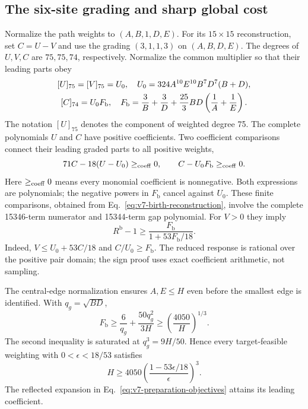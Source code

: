 \documentclass[aps,pre,reprint,amsmath,amssymb,longbibliography]{revtex4-2}
\begin{document}
\subsection{The six-site grading and sharp global cost}
\label{app:v7-birth-p6-cost}
Normalize the path weights to $(A,B,1,D,E)$. For its
$15\times15$ reconstruction, set $C=U-V$ and use the grading
$(3,1,1,3)$ on $(A,B,D,E)$. The degrees of $U,V,C$ are
$75,75,74$, respectively. Normalize the common multiplier so that
their leading parts obey
\begin{equation}
 \begin{gathered}
 \relax[U]_{75}=[V]_{75}=U_0,
 \quad U_0=324A^{10}E^{10}B^7D^7(B+D),\\
 [C]_{74}=U_0F_{\mathrm b},\quad
 F_{\mathrm b}=\frac3B+\frac3D
  +\frac{25}{3}BD\left(\frac1A+\frac1E\right).
 \end{gathered}
 \label{eq:v7-birth-p6-leading-grade}
\end{equation}
The notation $[U]_{75}$ denotes the component of weighted degree
75. The complete polynomials $U$ and $C$ have positive
coefficients. Two coefficient comparisons connect their leading
graded parts to all positive weights,
\begin{equation}
 71C-18(U-U_0)\ge_{\rm coeff}0,\qquad
 C-U_0F_{\mathrm b}\ge_{\rm coeff}0.
 \label{eq:v7-birth-p6-coefficients}
\end{equation}
Here $\ge_{\rm coeff}0$ means every monomial coefficient is nonnegative.
Both expressions are polynomials; the negative powers in
$F_{\mathrm b}$ cancel against $U_0$. These finite comparisons,
obtained from Eq.~\eqref{eq:v7-birth-reconstruction}, involve the
complete 15346-term numerator and 15344-term gap polynomial.
For $V>0$ they imply
\begin{equation}
 R^{\mathrm b}-1\ge
 \frac{F_{\mathrm b}}{1+53F_{\mathrm b}/18}.
 \label{eq:v7-birth-p6-global-gap}
\end{equation}
Indeed, $V\le U_0+53C/18$ and $C/U_0\ge F_{\mathrm b}$.
The reduced response is rational over the positive pair domain;
the sign proof uses exact coefficient arithmetic, not sampling.

The central-edge normalization ensures $A,E\le H$ even before the
smallest edge is identified. With $q_g=\sqrt{BD}$,
\begin{equation}
 F_{\mathrm b}\ge\frac6{q_g}+\frac{50q_g^2}{3H}
 \ge\left(\frac{4050}{H}\right)^{1/3}.
 \label{eq:v7-birth-p6-resource}
\end{equation}
The second inequality is saturated at $q_g^3=9H/50$. Hence every
target-feasible weighting with $0<\epsilon<18/53$ satisfies
\begin{equation}
 H\ge4050\left(\frac{1-53\epsilon/18}{\epsilon}\right)^3.
 \label{eq:v7-birth-finite-gap-bound}
\end{equation}
The reflected expansion in Eq.~\eqref{eq:v7-preparation-objectives}
attains its leading coefficient.
\end{document}
